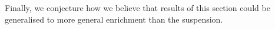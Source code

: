

\noindent Finally, we conjecture how we believe that results of this section could be generalised to more general enrichment than the suspension.






